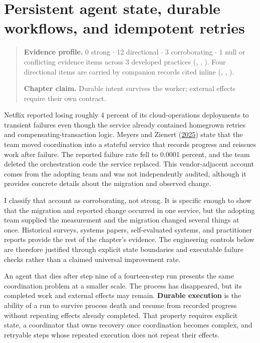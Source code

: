 \chapter{Persistent agent state, durable workflows, and idempotent retries}
\label{ch09-persistent-state-durable-workflows-idempotent-retries}
\begin{quote}
\textbf{Evidence profile.} 0 strong \(\cdot\) 12 directional \(\cdot\) 3 corroborating \(\cdot\) 1 null or conflicting evidence items across 3 developed practices (, , ). Four directional items are carried by companion records cited inline (, , ).

\textbf{Chapter claim.} Durable intent survives the worker; external effects require their own contract.
\end{quote}

Netflix reported losing roughly 4 percent of its cloud-operations deployments to transient failures even though the service already contained homegrown retries and compensating-transaction logic. Meyers and Zienert (\href{https://netflixtechblog.com/how-temporal-powers-reliable-cloud-operations-at-netflix-73c69ccb5953}{2025}) state that the team moved coordination into a stateful service that records progress and reissues work after failure. The reported failure rate fell to 0.0001 percent, and the team deleted the orchestration code the service replaced. This vendor-adjacent account comes from the adopting team and was not independently audited, although it provides concrete details about the migration and observed change.

I classify that account as corroborating, not strong. It is specific enough to show that the migration and reported change occurred in one service, but the adopting team supplied the measurement and the migration changed several things at once. Historical surveys, systems papers, self-evaluated systems, and practitioner reports provide the rest of the chapter's evidence. The engineering controls below are therefore justified through explicit state boundaries and executable failure checks rather than a claimed universal improvement rate.

An agent that dies after step nine of a fourteen-step run presents the same coordination problem at a smaller scale. The process has disappeared, but its completed work and external effects may remain. \textbf{Durable execution} is the ability of a run to survive process death and resume from recorded progress without repeating effects already completed. That property requires explicit state, a coordinator that owns recovery once coordination becomes complex, and retryable steps whose repeated execution does not repeat their effects.

